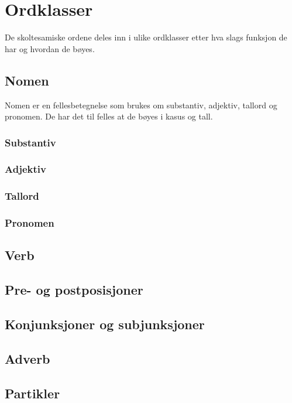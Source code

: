 \chapter{Ordklasser}

De skoltesamiske ordene deles inn i ulike ordklasser etter hva slags funksjon de har og hvordan de bøyes.

\section{Nomen}

Nomen er en fellesbetegnelse som brukes om substantiv, adjektiv, tallord og pronomen. De har det til felles at de bøyes i kasus og tall.

\subsection{Substantiv}

\subsection{Adjektiv}

\subsection{Tallord}

\subsection{Pronomen}

\section{Verb}

\section{Pre- og postposisjoner}

\section{Konjunksjoner og subjunksjoner}

\section{Adverb}

\section{Partikler}